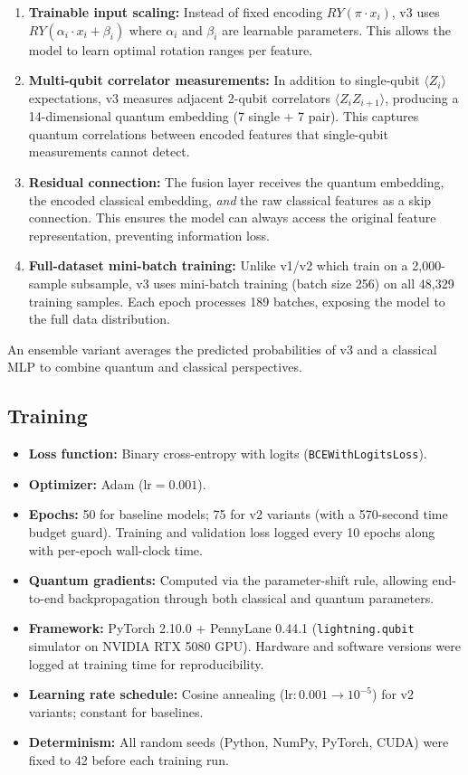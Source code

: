 \documentclass[12pt, letterpaper]{article}
\begin{document}
\begin{enumerate}
    \item \textbf{Trainable input scaling:} Instead of fixed encoding $RY(\pi \cdot x_i)$, v3 uses $RY(\alpha_i \cdot x_i + \beta_i)$ where $\alpha_i$ and $\beta_i$ are learnable parameters. This allows the model to learn optimal rotation ranges per feature.

    \item \textbf{Multi-qubit correlator measurements:} In addition to single-qubit $\langle Z_i \rangle$ expectations, v3 measures adjacent 2-qubit correlators $\langle Z_i Z_{i+1} \rangle$, producing a 14-dimensional quantum embedding (7 single + 7 pair). This captures quantum correlations between encoded features that single-qubit measurements cannot detect.

    \item \textbf{Residual connection:} The fusion layer receives the quantum embedding, the encoded classical embedding, \textit{and} the raw classical features as a skip connection. This ensures the model can always access the original feature representation, preventing information loss.

    \item \textbf{Full-dataset mini-batch training:} Unlike v1/v2 which train on a 2{,}000-sample subsample, v3 uses mini-batch training (batch size 256) on all 48{,}329 training samples. Each epoch processes 189 batches, exposing the model to the full data distribution.
\end{enumerate}

An ensemble variant averages the predicted probabilities of v3 and a classical MLP to combine quantum and classical perspectives.

\subsection{Training}
\begin{itemize}
    \item \textbf{Loss function:} Binary cross-entropy with logits (\texttt{BCEWithLogitsLoss}).
    \item \textbf{Optimizer:} Adam ($\text{lr} = 0.001$).
    \item \textbf{Epochs:} 50 for baseline models; 75 for v2 variants (with a 570-second time budget guard). Training and validation loss logged every 10 epochs along with per-epoch wall-clock time.
    \item \textbf{Quantum gradients:} Computed via the parameter-shift rule, allowing end-to-end backpropagation through both classical and quantum parameters.
    \item \textbf{Framework:} PyTorch 2.10.0 + PennyLane 0.44.1 (\texttt{lightning.qubit} simulator on NVIDIA RTX 5080 GPU). Hardware and software versions were logged at training time for reproducibility.
    \item \textbf{Learning rate schedule:} Cosine annealing ($\text{lr}: 0.001 \to 10^{-5}$) for v2 variants; constant for baselines.
    \item \textbf{Determinism:} All random seeds (Python, NumPy, PyTorch, CUDA) were fixed to 42 before each training run.
\end{itemize}
\end{document}
